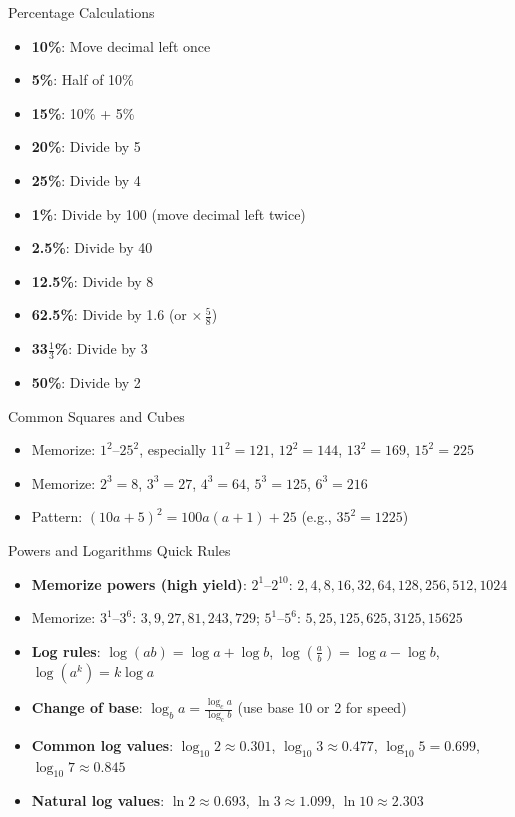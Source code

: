 \documentclass{article}
\begin{document}
\begin{mentalbox}{Percentage Calculations}
\begin{itemize}
\item \textbf{10\%}: Move decimal left once
\item \textbf{5\%}: Half of 10\%
\item \textbf{15\%}: 10\% + 5\%
\item \textbf{20\%}: Divide by 5
\item \textbf{25\%}: Divide by 4
\item \textbf{1\%}: Divide by 100 (move decimal left twice)
\item \textbf{2.5\%}: Divide by 40
\item \textbf{12.5\%}: Divide by 8
\item \textbf{62.5\%}: Divide by 1.6 (or $\times\,\frac{5}{8}$)
\item \textbf{33$\frac{1}{3}$\%}: Divide by 3
\item \textbf{50\%}: Divide by 2
\end{itemize}
\end{mentalbox}

\begin{mentalbox}{Common Squares and Cubes}
\begin{itemize}
\item Memorize: $1^2$--$25^2$, especially $11^2=121$, $12^2=144$, $13^2=169$, $15^2=225$
\item Memorize: $2^3=8$, $3^3=27$, $4^3=64$, $5^3=125$, $6^3=216$
\item Pattern: $(10a+5)^2 = 100a(a+1) + 25$ (e.g., $35^2 = 1225$)
\end{itemize}
\end{mentalbox}

\begin{mentalbox}{Powers and Logarithms Quick Rules}
\begin{itemize}
\item \textbf{Memorize powers (high yield)}: $2^1$--$2^{10}$: $2,4,8,16,32,64,128,256,512,1024$
\item Memorize: $3^1$--$3^6$: $3,9,27,81,243,729$; $5^1$--$5^6$: $5,25,125,625,3125,15625$
\item \textbf{Log rules}: $\log(ab)=\log a+\log b$, $\log\!\left(\frac{a}{b}\right)=\log a-\log b$, $\log(a^k)=k\log a$
\item \textbf{Change of base}: $\log_b a = \frac{\log_c a}{\log_c b}$ (use base 10 or 2 for speed)
\item \textbf{Common log values}: $\log_{10} 2 \approx 0.301$, $\log_{10} 3 \approx 0.477$, $\log_{10} 5 = 0.699$, $\log_{10} 7 \approx 0.845$
\item \textbf{Natural log values}: $\ln 2 \approx 0.693$, $\ln 3 \approx 1.099$, $\ln 10 \approx 2.303$
\end{itemize}
\end{mentalbox}
\end{document}
